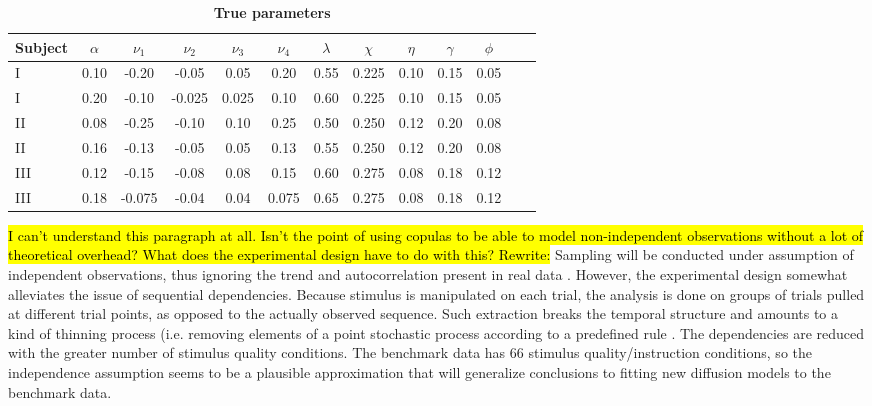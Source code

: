 \documentclass[12pt]{article}
\newcommand{\trish}[1]{\textrm{\hl{#1}}}
\begin{document}
\begin{table}[H]
\label{tab:parameters}
\centering
\caption{\textbf{True parameters}}
\begin{tabular}{|l*{11}{|c}|r}
\hline
Subject & $\alpha$ & $\nu_1$ & $\nu_2$ & $\nu_3$ & $\nu_4$ & $\lambda$ & $\chi$ & $\eta$ & $\gamma$ & $\phi$ \\ \hline
  I & 0.10 & -0.20 & -0.05 & 0.05 & 0.20 & 0.55 & 0.225 & 0.10 & 0.15 & 0.05 \\ \hline
  I & 0.20 & -0.10 & -0.025 & 0.025 & 0.10 & 0.60 & 0.225 & 0.10 & 0.15 & 0.05 \\ \hline
 II & 0.08 & -0.25 & -0.10 & 0.10 & 0.25 & 0.50 & 0.250 & 0.12 & 0.20 & 0.08 \\ \hline
 II & 0.16 & -0.13 & -0.05 & 0.05 & 0.13 & 0.55 & 0.250 & 0.12 & 0.20 & 0.08 \\ \hline
III & 0.12 & -0.15 & -0.08 & 0.08 & 0.15 & 0.60 & 0.275 & 0.08 & 0.18 & 0.12 \\ \hline
III & 0.18 & -0.075 & -0.04 & 0.04 & 0.075 & 0.65 & 0.275 & 0.08 & 0.18 & 0.12 \\
\hline
\end{tabular}
\end{table}

\trish{I can't understand this paragraph at all.  Isn't the point of
using copulas to be able to model non-independent observations without
a lot of theoretical overhead?  What does the experimental design have
to do with this?  Rewrite:} Sampling will be conducted under assumption
of independent observations, thus ignoring the trend and
autocorrelation present in real data
\citep{PerVan2002,CraPer2010}. However, the experimental design
somewhat alleviates the issue of sequential dependencies. Because
stimulus is manipulated on each trial, the analysis is done on groups
of trials pulled at different trial points, as opposed to the actually
observed sequence. Such extraction breaks the temporal structure and
amounts to a kind of thinning process (i.e. removing elements of a
point stochastic process according to a predefined rule
\citep{RobCas2004,GamLop2006,GelCar2013,Ros2014}. The dependencies are
reduced with the greater number of stimulus quality conditions. The
benchmark data has 66 stimulus quality/instruction
conditions, so the independence assumption seems to be a plausible
approximation that will generalize conclusions to fitting new
diffusion models to the benchmark data.
    
\end{document}
